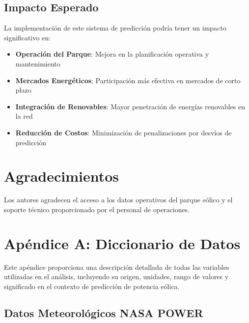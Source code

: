 \documentclass[conference]{IEEEtran}
\begin{document}
	\subsection{Impacto Esperado}
	La implementación de este sistema de predicción podría tener un impacto significativo en:
	\begin{itemize}
		\item \textbf{Operación del Parque}: Mejora en la planificación operativa y mantenimiento
		\item \textbf{Mercados Energéticos}: Participación más efectiva en mercados de corto plazo
		\item \textbf{Integración de Renovables}: Mayor penetración de energías renovables en la red
		\item \textbf{Reducción de Costos}: Minimización de penalizaciones por desvíos de predicción
	\end{itemize}
	
	\section{Agradecimientos}
	Los autores agradecen el acceso a los datos operativos del parque eólico y el soporte técnico proporcionado por el personal de operaciones.
	
	
	
	
	\newpage
	\section*{Apéndice A: Diccionario de Datos}
	
	Este apéndice proporciona una descripción detallada de todas las variables utilizadas en el análisis, incluyendo su origen, unidades, rango de valores y significado en el contexto de predicción de potencia eólica.
	
	\subsection{Datos Meteorológicos NASA POWER}
	
\end{document}
